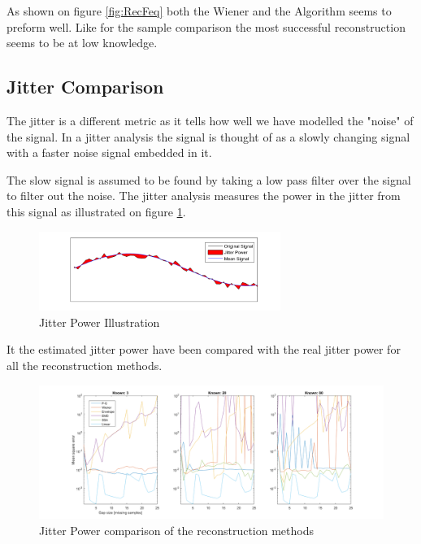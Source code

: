 As shown on figure \ref{fig:RecFeq} both the Wiener and the  Algorithm seems to preform well. Like for the sample comparison the most successful reconstruction seems to be at low knowledge. 

\subsection{Jitter Comparison }
\label{T:jitterCom}

The jitter is a different metric as it tells how well we have modelled the "noise" of the signal. In a jitter analysis the signal is thought of as a slowly changing signal with a faster noise signal embedded in it.

The slow signal is assumed to be found by taking a low pass filter over the signal to filter out the noise. The jitter analysis measures the power in the jitter from this signal as illustrated on figure \ref{fig:JitPow}. 

\begin{figure}[H]
\centering
\includegraphics[width=0.7\textwidth]{billeder/JitterPower.png}
\caption{Jitter Power Illustration}
\label{fig:JitPow}
\end{figure}

It the estimated jitter power have been compared with the real jitter power for all the reconstruction methods. 

\begin{figure}[H]
\centering
\includegraphics[width=1\textwidth]{billeder/RecJitter.png}
\caption{Jitter Power comparison of the reconstruction methods}
\label{fig:RecJit}
\end{figure}

